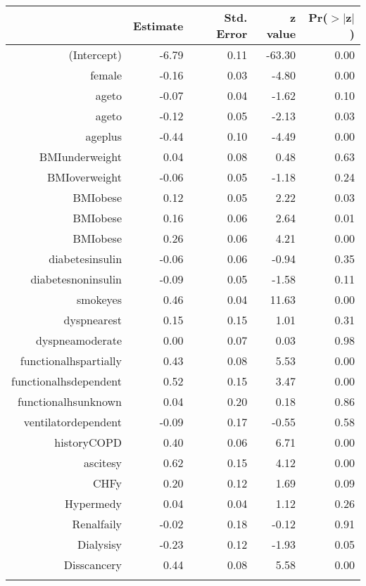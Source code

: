 \bigskip\bigskip
\centering
\begin{tabular}{rrrrr}
  \hline
 & Estimate & Std. Error & z value & Pr($>$$|$z$|$) \\ 
  \hline
(Intercept) & -6.79 & 0.11 & -63.30 & 0.00 \\ 
  female & -0.16 & 0.03 & -4.80 & 0.00 \\ 
  age\-65\-to\-74 & -0.07 & 0.04 & -1.62 & 0.10 \\ 
  age\-75\-to\-84 & -0.12 & 0.05 & -2.13 & 0.03 \\ 
  age\-85\-plus & -0.44 & 0.10 & -4.49 & 0.00 \\ 
  BMI\-underweight & 0.04 & 0.08 & 0.48 & 0.63 \\ 
  BMI\-overweight & -0.06 & 0.05 & -1.18 & 0.24 \\ 
  BMI\-obese\-1 & 0.12 & 0.05 & 2.22 & 0.03 \\ 
  BMI\-obese\-2 & 0.16 & 0.06 & 2.64 & 0.01 \\ 
  BMI\-obese\-3 & 0.26 & 0.06 & 4.21 & 0.00 \\ 
  diabetes\-insulin & -0.06 & 0.06 & -0.94 & 0.35 \\ 
  diabetes\-noninsulin & -0.09 & 0.05 & -1.58 & 0.11 \\ 
  smoke\-yes & 0.46 & 0.04 & 11.63 & 0.00 \\ 
  dyspnea\-rest & 0.15 & 0.15 & 1.01 & 0.31 \\ 
  dyspnea\-moderate & 0.00 & 0.07 & 0.03 & 0.98 \\ 
  functional\-hs\-partially & 0.43 & 0.08 & 5.53 & 0.00 \\ 
  functional\-hs\-dependent & 0.52 & 0.15 & 3.47 & 0.00 \\ 
  functional\-hs\-unknown & 0.04 & 0.20 & 0.18 & 0.86 \\ 
  ventilator\-dependent & -0.09 & 0.17 & -0.55 & 0.58 \\ 
  history\-COPD & 0.40 & 0.06 & 6.71 & 0.00 \\ 
  ascites\-y & 0.62 & 0.15 & 4.12 & 0.00 \\ 
  CHF\-y & 0.20 & 0.12 & 1.69 & 0.09 \\ 
  Hyper\-med\-y & 0.04 & 0.04 & 1.12 & 0.26 \\ 
  Renal\-fail\-y & -0.02 & 0.18 & -0.12 & 0.91 \\ 
  Dialysis\-y & -0.23 & 0.12 & -1.93 & 0.05 \\ 
  Diss\-cancer\-y & 0.44 & 0.08 & 5.58 & 0.00 \\ 
$$
\end{tabular}
